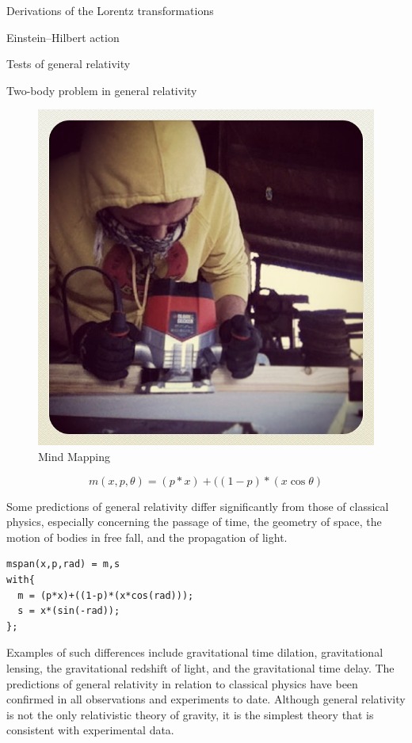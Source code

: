 \documentclass[
	a4paper,
	twocolumn
	]{article}
\begin{document}
\begin{compactitem}
\item Derivations of the Lorentz transformations
\item Einstein–Hilbert action
\item Tests of general relativity
\item Two-body problem in general relativity
\end{compactitem}

\begin{figure}[t]
\centering
\includegraphics[width=.47\textwidth]{img/image2.jpg}
\caption{Mind Mapping}
\label{gs}
\end{figure}

\begin{equation}
m(x,p,\theta) = (p*x) + ((1-p)*(x\cos\theta)
\label{eq:mid}
\end{equation}

Some predictions of general relativity differ significantly from those of
classical physics, especially concerning the passage of time, the geometry of
space, the motion of bodies in free fall, and the propagation of light.

\begin{lstlisting}
mspan(x,p,rad) = m,s
with{
  m = (p*x)+((1-p)*(x*cos(rad)));
  s = x*(sin(-rad));
};
\end{lstlisting}

Examples
of such differences include gravitational time dilation, gravitational lensing,
the gravitational redshift of light, and the gravitational time delay. The
predictions of general relativity in relation to classical physics have been
confirmed in all observations and experiments to date. Although general
relativity is not the only relativistic theory of gravity, it is the simplest
theory that is consistent with experimental data.

\vfill\null

\raggedright


\end{document}
